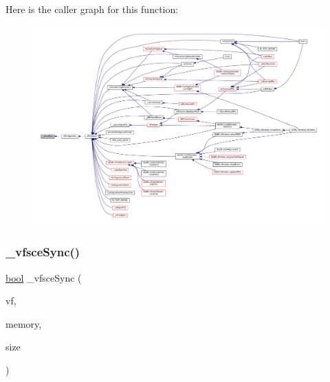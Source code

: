 Here is the caller graph for this function\+:
\nopagebreak
\begin{figure}[H]
\begin{center}
\leavevmode
\includegraphics[width=350pt]{sce-vfs_8c_ab0da49443a78b59044b44713a9164452_icgraph}
\end{center}
\end{figure}
\mbox{\label{sce-vfs_8c_a2e5832acdb13477bec265326bc727547}} 
\subsubsection{\texorpdfstring{\+\_\+vfsce\+Sync()}{\_vfsceSync()}}
{\footnotesize\ttfamily \mbox{\hyperlink{libretro_8h_a4a26dcae73fb7e1528214a068aca317e}{bool}} \+\_\+vfsce\+Sync (\begin{DoxyParamCaption}\item[{struct V\+File $\ast$}]{vf,  }\item[{const void $\ast$}]{memory,  }\item[{size\+\_\+t}]{size }\end{DoxyParamCaption})\hspace{0.3cm}{\ttfamily [static]}}

